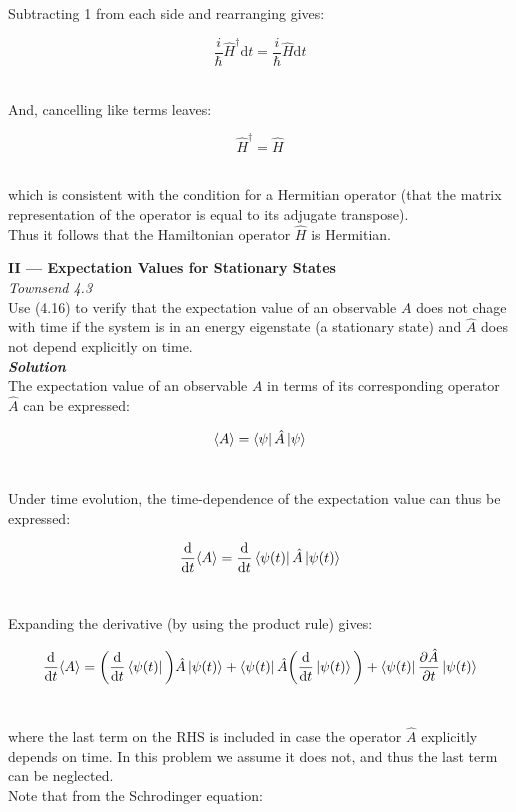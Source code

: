 \documentclass[14pt]{extarticle}
\newcommand{\bfit}[1]{\textbf{\textit{#1}}}
\renewcommand{\d}{\text{d}}
\newcommand{\ddt}[1]{\frac{\d #1}{\d t}}
\newcommand{\pd}[2]{\frac{\partial #1}{\partial #2}}
\begin{document}
Subtracting 1 from each side and rearranging gives:

$$\frac i \hbar \hat H^\dagger \d t = \frac i \hbar \hat H \d t$$ \ 

And, cancelling like terms leaves:

$$\hat H^\dagger = \hat H$$ \ 

which is consistent with the condition for a Hermitian operator (that the matrix representation of the operator is equal to its adjugate transpose). \\ 

Thus it follows that the Hamiltonian operator $\hat H$ is Hermitian. \\ 





\hrulefill 

\hfill 

{\bf \LARGE II --- Expectation Values for Stationary States} \\ 

{\it Townsend 4.3} \\ 
Use (4.16) to verify that the expectation value of an observable $A$ does not chage with time if the system is in an energy eigenstate (a stationary state) and $\hat A$ does not depend explicitly on time. \\ 

{\bfit{Solution}} \\ 
The expectation value of an observable $A$ in terms of its corresponding operator $\hat A$ can be expressed:

$$\langle A \rangle = \bra{\psi} \hat A \ket{\psi}$$ \ 

Under time evolution, the time-dependence of the expectation value can thus be expressed:

$$\ddt{} \langle A \rangle = \ddt{} \bra{\psi(t)} \hat A \ket{\psi(t)}$$ \ 

Expanding the derivative (by using the product rule) gives:

$$\ddt{} \langle A \rangle = \bigg( \ddt{} \bra{\psi(t)} \bigg) \hat A \ket{\psi(t)} + \bra{\psi(t)} \hat A \bigg( \ddt{} \ket{\psi(t)} \bigg) + \bra{\psi(t)} \pd{\hat A}{t} \ket{\psi(t)}$$ \ 

where the last term on the RHS is included in case the operator $\hat A$ explicitly depends on time. In this problem we assume it does not, and thus the last term can be neglected. \\ 

Note that from the Schrodinger equation:
\end{document}

